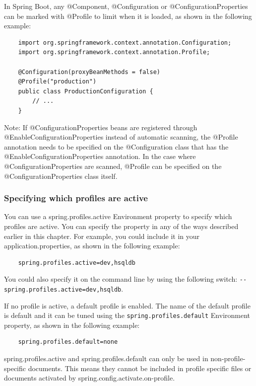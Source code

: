 \documentclass{scrartcl}
\begin{document}
In Spring Boot, any @Component, @Configuration or @ConfigurationProperties can be marked with @Profile to limit when it is loaded, as shown in the following example:

\begin{lstlisting}
    import org.springframework.context.annotation.Configuration;
    import org.springframework.context.annotation.Profile;

    @Configuration(proxyBeanMethods = false)
    @Profile("production")
    public class ProductionConfiguration {
        // ...
    }
\end{lstlisting}

Note: If @ConfigurationProperties beans are registered through @EnableConfigurationProperties instead of automatic scanning, the @Profile annotation needs to be specified on the @Configuration class that has the @EnableConfigurationProperties annotation. In the case where @ConfigurationProperties are scanned, @Profile can be specified on the @ConfigurationProperties class itself.


\subsubsection{Specifying which profiles are active}

You can use a spring.profiles.active Environment property to specify which profiles are active. You can specify the property in any of the ways described earlier in this chapter. For example, you could include it in your application.properties, as shown in the following example:

\begin{lstlisting}
    spring.profiles.active=dev,hsqldb
\end{lstlisting}


You could also specify it on the command line by using the following switch: \lstinline|--spring.profiles.active=dev,hsqldb|.

If no profile is active, a default profile is enabled. The name of the default profile is default and it can be tuned using the \lstinline|spring.profiles.default| Environment property, as shown in the following example:


\begin{lstlisting}
    spring.profiles.default=none
\end{lstlisting}

spring.profiles.active and spring.profiles.default can only be used in non-profile-specific documents. This means they cannot be included in profile specific files or documents activated by spring.config.activate.on-profile.
\end{document}
